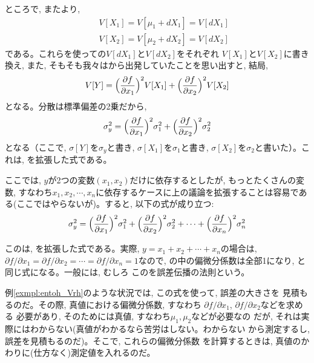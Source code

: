 ところで, またより, 
\begin{eqnarray}
&&V[X_1]=V[\mu_1+dX_1]=V[dX_1]\\
&&V[X_2]=V[\mu_2+dX_2]=V[dX_2]
\end{eqnarray}
である。これらを使っての$V[dX_1]$と$V[dX_2]$をそれぞれ
$V[X_1]$と$V[X_2]$に書き換え, また, そもそも我々はから出発していたことを思い出すと, 結局, 
\begin{eqnarray}
V[Y] = \Bigl(\frac{\partial f}{\partial x_1}\Bigr)^2V[X_1] + \Bigl(\frac{\partial f}{\partial x_2}\Bigr)^2V[X_2]
\label{eq:gosa_zenbibun12}
\end{eqnarray}
となる。分散は標準偏差の2乗だから, 
\begin{eqnarray}
\sigma_y^2 = \Bigl(\frac{\partial f}{\partial x_1}\Bigr)^2\sigma_1^2 + \Bigl(\frac{\partial f}{\partial x_2}\Bigr)^2\sigma_2^2\label{eq:gosa_zenbibun140}
\end{eqnarray}
となる（ここで, $\sigma[Y]$を$\sigma_y$と書き, $\sigma[X_1]$を$\sigma_1$と書き, $\sigma[X_2]$を$\sigma_2$と書いた）。これは, 
を拡張した式である。

ここでは, $y$が2つの変数$(x_1, x_2)$だけに依存するとしたが, もっとたくさんの変数, すなわち$x_1, x_2, \cdots, x_n$に依存するケースに上の議論を拡張することは容易である(ここではやらないが)。すると, 以下の式が成り立つ:
\begin{eqnarray}
\sigma_y^2 = \Bigl(\frac{\partial f}{\partial x_1}\Bigr)^2\sigma_1^2 + \Bigl(\frac{\partial f}{\partial x_2}\Bigr)^2\sigma_2^2+\cdots+\Bigl(\frac{\partial f}{\partial x_n}\Bigr)^2\sigma_n^2\nonumber\\
\label{eq:gosa_zenbibun14}
\end{eqnarray}

このは, を拡張した式である。実際, $y=x_1+x_2+\cdots+x_n$の場合は, 
$\partial f/\partial x_1=\partial f/\partial x_2=\cdots=\partial f/\partial x_n=1$なので, 
の中の偏微分係数は全部1になり, と同じ式になる。一般には, むしろ
このを誤差伝播の法則という。

例\ref{exmpl:entoh_Vrh}のような状況では, この式を使って, 誤差の大きさを
見積もるのだ。その際, 真値における偏微分係数, すなわち
$\partial f/\partial x_1$, $\partial f/\partial x_2$などを求める
必要があり, そのためには真値, すなわち$\mu_1, \mu_2$などが必要なの
だが, それは実際にはわからない(真値がわかるなら苦労はしない。わからない
から測定するし, 誤差を見積もるのだ)。そこで, これらの偏微分係数
を計算するときは, 真値のかわりに(仕方なく)測定値を入れるのだ。\\

